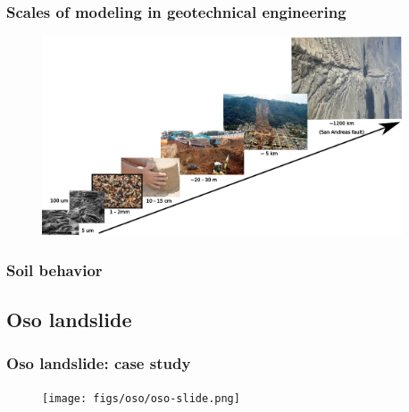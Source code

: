 \documentclass[notes]{beamer}
\begin{document}
\begin{frame}
\frametitle{Scales of modeling in geotechnical engineering}
	\begin{figure}
		\includegraphics[width=0.95\textwidth]{figs/soil-scale.png}
	\end{figure}
\end{frame}

\begin{frame}
\frametitle{Soil behavior}
\end{frame}

\subsection{Oso landslide}
\begin{frame}
	\frametitle{Oso landslide: case study}
	\begin{figure}
		\texttt{[image: figs/oso/oso-slide.png]}
	\end{figure}
\end{frame}
\end{document}
